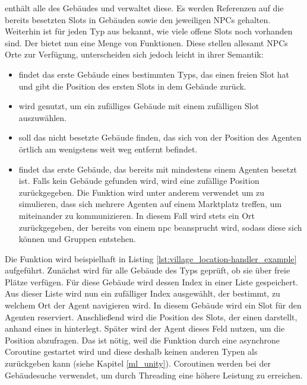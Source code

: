  enthält alle  des Gebäudes und verwaltet diese. Es werden Referenzen auf die bereits besetzten Slots in Gebäuden sowie den jeweiligen NPCs gehalten. Weiterhin ist für jeden Typ aus  bekannt, wie viele offene Slots noch vorhanden sind.
Der  bietet nun eine Menge von Funktionen. Diese stellen allesamt NPCs Orte zur Verfügung, unterscheiden sich jedoch leicht in ihrer Semantik:
\begin{itemize}
    \item {} findet das erste Gebäude eines bestimmten Typs, das einen freien Slot hat und gibt die Position des ersten Slots in dem Gebäude zurück.
    \item {} wird genutzt, um ein zufälliges Gebäude mit einem zufälligen Slot auszuwählen.
    \item {} soll das nicht besetzte Gebäude finden, das sich von der Position des Agenten örtlich am wenigstens weit weg entfernt befindet.
    \item {} findet das erste Gebäude, das bereits mit mindestens einem Agenten besetzt ist. Falls kein Gebäude gefunden wird, wird eine zufällige Position zurückgegeben. Die Funktion wird unter anderem verwendet um zu simulieren, dass sich mehrere Agenten auf einem Marktplatz treffen, um miteinander zu kommunizieren. In diesem Fall wird stets ein Ort zurückgegeben, der bereits von einem \ac{npc} beansprucht wird, sodass diese sich  können und Gruppen entstehen.
\end{itemize}

Die Funktion  wird beispielhaft in Listing \ref{lst:village_location-handler_example} aufgeführt. Zunächst wird für alle Gebäude des Typs geprüft, ob sie über freie Plätze verfügen. Für diese Gebäude wird dessen Index in einer Liste gespeichert. Aus dieser Liste wird nun ein zufälliger Index  ausgewählt, der bestimmt, zu welchem Ort der Agent navigieren wird. In diesem Gebäude  wird ein Slot für den Agenten reserviert. Anschließend wird die Position des Slots, der einen  darstellt, anhand eines  in  hinterlegt. Später wird der Agent dieses Feld nutzen, um die Position abzufragen. Das ist nötig, weil die Funktion durch eine asynchrone Coroutine gestartet wird und diese deshalb keinen anderen Typen als  zurückgeben kann (siehe Kapitel \ref{ml_unity}). Coroutinen werden bei der Gebäudesuche verwendet, um durch Threading eine höhere Leistung zu erreichen.

